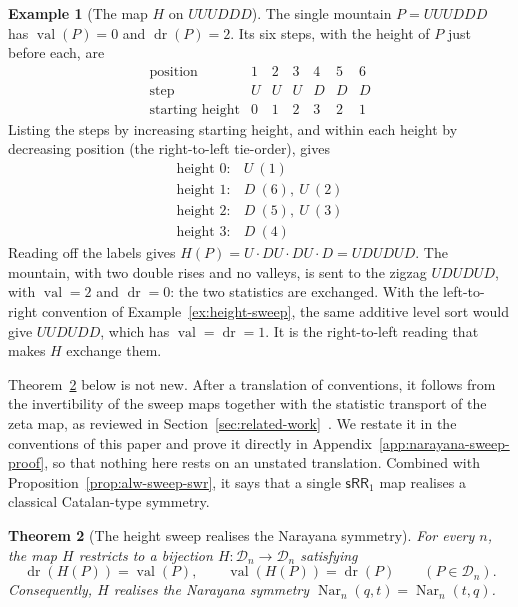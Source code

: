 \documentclass[11pt]{article}
\newtheorem{theorem}{Theorem}[section]
\theoremstyle{definition}
\newtheorem{example}[theorem]{Example}
\newcommand{\D}{\mathcal D}
\newcommand{\SWR}{\mathsf{sRR}_1}
\newcommand{\val}{\operatorname{val}}
\newcommand{\dr}{\operatorname{dr}}
\newcommand{\Nar}{\operatorname{Nar}}
\begin{document}
\begin{example}[The map $H$ on $UUUDDD$]\label{ex:narayana-sweep}
The single mountain $P=UUUDDD$ has $\val(P)=0$ and $\dr(P)=2$.  Its six steps,
with the height of $P$ just before each, are
\[
   \begin{array}{c|cccccc}
     \text{position}        & 1 & 2 & 3 & 4 & 5 & 6\\\hline
     \text{step}            & U & U & U & D & D & D\\
     \text{starting height} & 0 & 1 & 2 & 3 & 2 & 1
   \end{array}
\]
Listing the steps by increasing starting height, and within each height by
decreasing position (the right-to-left tie-order), gives
\[
   \begin{array}{r|l}
     \text{height }0: & U\ (1)\\
     \text{height }1: & D\ (6),\ U\ (2)\\
     \text{height }2: & D\ (5),\ U\ (3)\\
     \text{height }3: & D\ (4)
   \end{array}
\]
Reading off the labels gives $H(P)=U\cdot DU\cdot DU\cdot D=UDUDUD$.  The mountain, with two double
rises and no valleys, is sent to the zigzag $UDUDUD$, with $\val=2$ and $\dr=0$:
the two statistics are exchanged.  With the left-to-right convention of
Example~\ref{ex:height-sweep}, the same additive level sort would give
$UUDUDD$, which has $\val=\dr=1$.  It is the right-to-left reading that makes
$H$ exchange them.
\end{example}

Theorem~\ref{thm:narayana-sweep} below is not new.  After a translation of
conventions, it follows from the invertibility of the sweep maps together with
the statistic transport of the zeta map, as reviewed in
Section~\ref{sec:related-work}~\cite{ArmstrongLoehrWarrington2015,
ThomasWilliams2018,CeballosFangMuhle2020,SulzgruberThiel2018}.  We restate it
in the conventions of this paper and prove it directly in
Appendix~\ref{app:narayana-sweep-proof}, so that nothing here rests on an
unstated translation.  Combined with Proposition~\ref{prop:alw-sweep-swr}, it
says that a single $\SWR$ map realises a classical Catalan-type symmetry.

\begin{theorem}[The height sweep realises the Narayana symmetry]
\label{thm:narayana-sweep}
For every $n$, the map $H$ restricts to a bijection
$H\colon\D_n\to\D_n$ satisfying
\[
   \dr(H(P))=\val(P),\qquad \val(H(P))=\dr(P)
   \qquad (P\in\D_n).
\]
Consequently, $H$ realises the Narayana symmetry
$\Nar_n(q,t)=\Nar_n(t,q)$.
\end{theorem}
\end{document}
